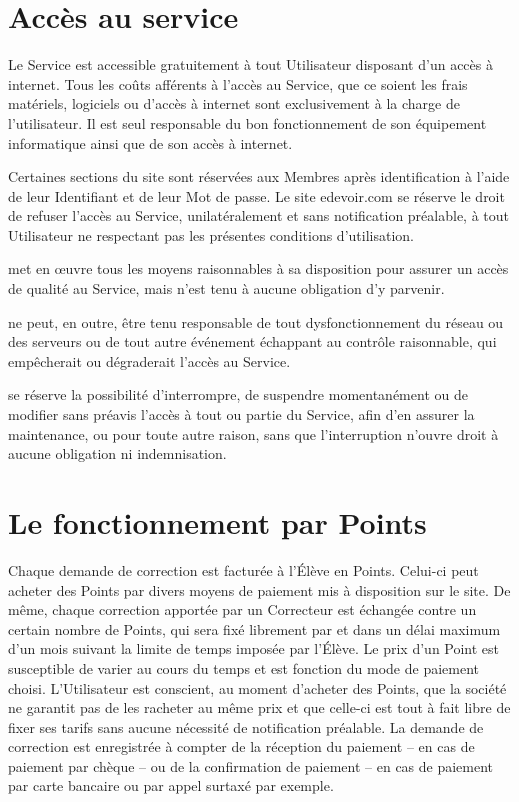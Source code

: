 \section{Accès au service}

Le Service est accessible gratuitement à tout Utilisateur disposant d'un accès à internet. Tous les coûts afférents à l'accès au Service, que ce soient les frais matériels, logiciels ou d'accès à internet sont exclusivement à la charge de l'utilisateur. Il est seul responsable du bon fonctionnement de son équipement informatique ainsi que de son accès à internet.

Certaines sections du site sont réservées aux Membres après identification à l'aide de leur Identifiant et de leur Mot de passe.
Le site edevoir.com se réserve le droit de refuser l'accès au Service, unilatéralement et sans notification préalable, à tout Utilisateur ne respectant pas les présentes conditions d'utilisation.

\eDevoir met en œuvre tous les moyens raisonnables à sa disposition pour assurer un accès de qualité au Service, mais n'est tenu à aucune obligation d'y parvenir.

\eDevoir ne peut, en outre, être tenu responsable de tout dysfonctionnement du réseau ou des serveurs ou de tout autre événement échappant au contrôle raisonnable, qui empêcherait ou dégraderait l'accès au Service.

\eDevoir se réserve la possibilité d'interrompre, de suspendre momentanément ou de modifier sans préavis l'accès à tout ou partie du Service, afin d'en assurer la maintenance, ou pour toute autre raison, sans que l'interruption n'ouvre droit à aucune obligation ni indemnisation.


\section{Le fonctionnement par Points}

Chaque demande de correction est facturée à l'Élève en Points. Celui-ci peut acheter des Points par divers moyens de paiement mis à disposition sur le site. De même, chaque correction apportée par un Correcteur est échangée contre un certain nombre de Points, qui sera fixé librement par \eDevoir et dans un délai maximum d'un mois suivant la limite de temps imposée par l'Élève. Le prix d'un Point est susceptible de varier au cours du temps et est fonction du mode de paiement choisi. L'Utilisateur est conscient, au moment d'acheter des Points, que la société \eDevoir ne garantit pas de les racheter au même prix et que celle-ci est tout à fait libre de fixer ses tarifs sans aucune nécessité de notification préalable.
La demande de correction est enregistrée à compter de la réception du paiement -- en cas de paiement par chèque -- ou de la confirmation de paiement -- en cas de paiement par carte bancaire ou par appel surtaxé par exemple.

